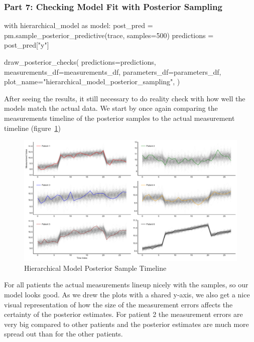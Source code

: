 \documentclass[12pt,a4paper,leqno]{report}
\theoremstyle{plain}
\theoremstyle{definition}
\theoremstyle{remark}
\begin{document}
\subsubsection*{Part 7: Checking Model Fit with Posterior Sampling}

\bigskip
\begin{pyverbatim}[][fontsize=\footnotesize]
with hierarchical_model as model:
    post_pred = pm.sample_posterior_predictive(trace, samples=500)
    predictions = post_pred["y"]

draw_posterior_checks(
    predictions=predictions,
    measurements_df=measurements_df,
    parameters_df=parameters_df,
    plot_name="hierarchical_model_posterior_sampling",
)
\end{pyverbatim}
\smallskip

After seeing the results, it still necessary to do reality check with how well the
models match the actual data. We start by once again comparing the measurements timeline
of the posterior samples to the actual measurement timeline (figure\ \ref{hierarhicalmodelposteriortimeline})

\bigskip
\begin{figure}[H]
    \caption{Hierarchical Model Posterior Sample Timeline}\label{hierarhicalmodelposteriortimeline}
    \bigskip
    \includegraphics[width=\textwidth,height=\textheight,keepaspectratio]{posterior_sample_timeline_hierarchical_model.pdf}
\end{figure}
\bigskip

For all patients the actual measurements lineup nicely with the samples, so our model
looks good. As we drew the plots with a shared y-axis, we also get a nice visual
representation of how the size of the measurement errors
affects the certainty of the posterior estimates. For patient 2 the measurement errors are
very big compared to other patients and the posterior estimates
are much more spread out than for the other patients.
\end{document}
